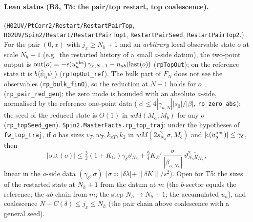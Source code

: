 \documentclass[11pt]{amsart}
\theoremstyle{definition}
\theoremstyle{remark}
\numberwithin{equation}{section}
\begin{document}
\paragraph{Lean status (B3, T5: the pair/top restart, top coalescence).}
(\texttt{H02UV/PtCorr2/Restart/RestartPairTop}, \texttt{H02UV/Spin2/Restart/RestartPairTop1}, \texttt{RestartPairSeed}, \texttt{RestartPairTop2}.)
For the pair $(0,x)$ with $j_x\ge N_h+1$ and an \emph{arbitrary} local observable state $o$ at scale $N_h+1$
(e.g.\ the restarted history of a small $a$-side datum), the two-point output is
$\mathrm{out}(o)=-\epsilon(u^{\rm obs}_a)\,\gamma_{x,N-1}-n_{ab}(\mathrm{last}(o))$ (\texttt{rpTopOut}); on the
reference state it is $b\langle\bar\psi_0\psi_x\rangle$ (\texttt{rpTopOut\_ref}). The bulk part of $F_N$ does not
see the observables (\texttt{rp\_bulk\_finO}), so the reduction at $N-1$ holds for $o$
(\texttt{rp\_pair\_red\_gen}); the zero mode is bounded with an absolute $a$-side, normalised by the reference
one-point data ($|c|\le4|\gamma_{a,N}||s_0|/|\beta|$, \texttt{rp\_zero\_abs}); the seed of the reduced state
is $O(1)$ in $wM(M_a,M_b)$ for any $o$ (\texttt{rp\_topSeed\_gen}). \texttt{Spin2.MasterFacts.rp\_top\_traj}: under
the hypotheses of \texttt{fw\_top\_traj}, if $o$ has sizes $v_T,w_T,k_{xT},k_2$ in $wM(2s_{N_h}^2\sigma,M_b)$ and
$|\epsilon(u^{\rm obs}_a)|\le\gamma_\delta$, then
\[
  |\mathrm{out}(o)|\le\tfrac32(1+K_O)\gamma_\delta\vartheta_{N_h}
  +\tfrac94K_E'\,\frac{\sigma}{|\beta_{a,N_h}|}\,\vartheta_{N_h}^2\check g_{N_h},
\]
linear in the $a$-side data $(\gamma_\delta,\sigma)$ ($\sigma\asymp|\delta\lambda|+\|\delta K\|/s^2$).
Open for T5: the sizes of the restarted state at $N_h+1$ from the datum at $m$ (the $b$-sector equals
the reference; the $ab$ chain from $m$; the step $N_h\to N_h+1$; the accumulated $u_a$), and
coalescence $N-C(\delta)\le j_x\le N_h$ (the pair chain above coalescence with a general seed).
\end{document}
